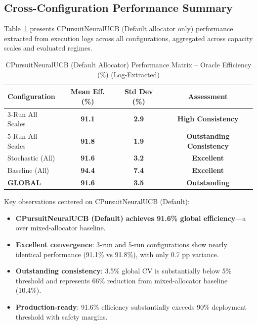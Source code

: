 \documentclass[12pt,a4paper]{article}
\newcommand{\success}[1]{\textcolor{accentgreen}{\textbf{#1}}}
\begin{document}
\begin{tcolorbox}[colback=tableheader,colframe=primaryblue,title=\textbf{Primary Performance Results (CPursuitNeuralUCB Default Allocator, Log-Extracted)}]

\subsection{Cross-Configuration Performance Summary}

Table~\ref{tab:cpursuit_performance_matrix} presents CPursuitNeuralUCB (Default allocator only) performance extracted from execution logs across all configurations, aggregated across capacity scales and evaluated regimes.

\begin{table}[H]
\centering
\caption{CPursuitNeuralUCB (Default Allocator) Performance Matrix -- Oracle Efficiency (\%) (Log-Extracted)}
\label{tab:cpursuit_performance_matrix}
\begin{tabular}{@{}lccc@{}}
\toprule
\textbf{Configuration} & \textbf{Mean Eff. (\%)} & \textbf{Std Dev (\%)} & \textbf{Assessment} \\
\midrule
3-Run All Scales & \success{91.1} & \success{2.9} & \success{High Consistency} \\
5-Run All Scales & \success{91.8} & \success{1.9} & \success{Outstanding Consistency} \\
\midrule
Stochastic (All) & \success{91.6} & \success{3.2} & \success{Excellent} \\
Baseline (All) & \success{94.4} & \success{7.4} & \success{Excellent} \\
\midrule
\textbf{GLOBAL} & \textbf{\success{91.6}} & \textbf{\success{3.5}} & \textbf{\success{Outstanding}} \\
\bottomrule
\end{tabular}
\end{table}

Key observations centered on CPursuitNeuralUCB (Default):

\begin{itemize}
    \item \success{CPursuitNeuralUCB (Default) achieves 91.6\% global efficiency}—a  over mixed-allocator baseline.
    
    \item \success{Excellent convergence}: 3-run and 5-run configurations show nearly identical performance (91.1\% vs 91.8\%), with only 0.7 pp variance.
    
    \item \success{Outstanding consistency}: 3.5\% global CV is substantially below 5\% threshold and represents 66\% reduction from mixed-allocator baseline (10.4\%).
    
    \item \success{Production-ready}: 91.6\% efficiency substantially exceeds 90\% deployment threshold with safety margins.
\end{itemize}

\end{tcolorbox}
\end{document}
